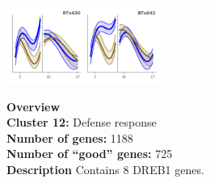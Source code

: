 \begin{multicols}{2}
\includegraphics[width=2in]{figures/clusters/root_Preflowering_11.png}
\columnbreak

\noindent \textbf{Overview}\\\textbf{Cluster 12:} Defense response \\
\textbf{Number of genes:} 1188 \\
\textbf{Number of ``good'' genes:} 725 \\
\textbf{Description} Contains 8 DREB1 genes. \\
\end{multicols}


